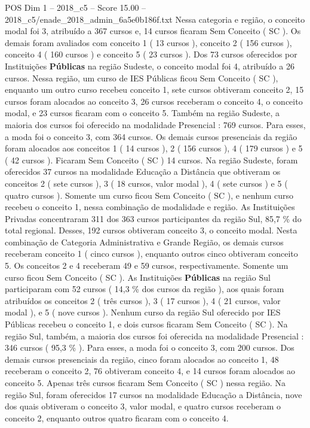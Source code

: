 \begin{textsample}{POS Dim 1 – 2018\_c5 – Score 15.00 – 2018\_c5/enade\_2018\_admin\_6a5e0b186f.txt}
Nessa categoria e região, o conceito modal foi 3, atribuído a 367 cursos e, 14 cursos ficaram Sem Conceito ( SC ).
Os demais foram avaliados com conceito 1 ( 13 cursos ), conceito 2 ( 156 cursos ), conceito 4 ( 160 cursos ) e conceito 5 ( 23 cursos ).
Dos 73 cursos oferecidos por Instituições \textbf{Públicas} na região Sudeste, o conceito modal foi 4, atribuído a 26 cursos.
Nessa região, um curso de IES Públicas ficou Sem Conceito ( SC ), enquanto um outro curso recebeu conceito 1, sete cursos obtiveram conceito 2, 15 cursos foram alocados ao conceito 3, 26 cursos receberam o conceito 4, o conceito modal, e 23 cursos ficaram com o conceito 5.
Também na região Sudeste, a maioria dos cursos foi oferecido na modalidade Presencial : 769 cursos.
Para esses, a moda foi o conceito 3, com 364 cursos.
Os demais cursos presenciais da região foram alocados aos conceitos 1 ( 14 cursos ), 2 ( 156 cursos ), 4 ( 179 cursos ) e 5 ( 42 cursos ).
Ficaram Sem Conceito ( SC ) 14 cursos.
Na região Sudeste, foram oferecidos 37 cursos na modalidade Educação a Distância que obtiveram os conceitos 2 ( sete cursos ), 3 ( 18 cursos, valor modal ), 4 ( sete cursos ) e 5 ( quatro cursos ).
Somente um curso ficou Sem Conceito ( SC ), e nenhum curso recebeu o conceito 1, nessa combinação de modalidade e região.
As Instituições Privadas concentraram 311 dos 363 cursos participantes da região Sul, 85,7 \% do total regional.
Desses, 192 cursos obtiveram conceito 3, o conceito modal.
Nesta combinação de Categoria Administrativa e Grande Região, os demais cursos receberam conceito 1 ( cinco cursos ), enquanto outros cinco obtiveram conceito 5.
Os conceitos 2 e 4 receberam 49 e 59 cursos, respectivamente.
Somente um curso ficou Sem Conceito ( SC ).
As Instituições \textbf{Públicas} na região Sul participaram com 52 cursos ( 14,3 \% dos cursos da região ), aos quais foram atribuídos os conceitos 2 ( três cursos ), 3 ( 17 cursos ), 4 ( 21 cursos, valor modal ), e 5 ( nove cursos ).
Nenhum curso da região Sul oferecido por IES Públicas recebeu o conceito 1, e dois cursos ficaram Sem Conceito ( SC ).
Na região Sul, também, a maioria dos cursos foi oferecida na modalidade Presencial : 346 cursos ( 95,3 \% ).
Para esses, a moda foi o conceito 3, com 200 cursos.
Dos demais cursos presenciais da região, cinco foram alocados ao conceito 1, 48 receberam o conceito 2, 76 obtiveram conceito 4, e 14 cursos foram alocados ao conceito 5.
Apenas três cursos ficaram Sem Conceito ( SC ) nessa região.
Na região Sul, foram oferecidos 17 cursos na modalidade Educação a Distância, nove dos quais obtiveram o conceito 3, valor modal, e quatro cursos receberam o conceito 2, enquanto outros quatro ficaram com o conceito 4.

\end{textsample}
